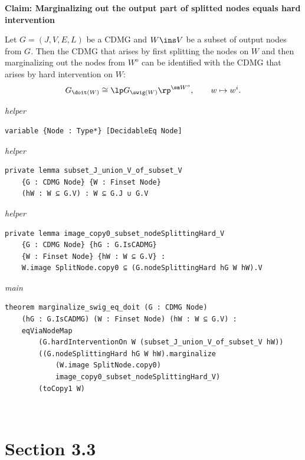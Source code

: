 \noindent\textbf{Claim: Marginalizing out the output part of splitted nodes equals hard intervention}\par\smallskip
{\appendixTexSize
     Let $G=(J,V,E,L)$ be a CDMG and $W \ins V$ be a subset of output nodes from $G$.
     Then the CDMG that arises by first splitting the nodes on $W$
      and then marginalizing out the nodes from $W^o$
     can be identified with the CDMG that arises by hard intervention on $W$:
     \[ G_{\doit(W)} \cong \lp G_{\swig(W)}\rp^{\sm W^o}, \qquad w \mapsto w^i. \]
\par}
\smallskip
{\small\textit{helper}}
\begin{verbatim}
variable {Node : Type*} [DecidableEq Node]
\end{verbatim}
{\small\textit{helper}}
\begin{verbatim}
private lemma subset_J_union_V_of_subset_V
    {G : CDMG Node} {W : Finset Node}
    (hW : W ⊆ G.V) : W ⊆ G.J ∪ G.V
\end{verbatim}
{\small\textit{helper}}
\begin{verbatim}
private lemma image_copy0_subset_nodeSplittingHard_V
    {G : CDMG Node} {hG : G.IsCADMG}
    {W : Finset Node} {hW : W ⊆ G.V} :
    W.image SplitNode.copy0 ⊆ (G.nodeSplittingHard hG W hW).V
\end{verbatim}
{\small\textit{main}}
\begin{verbatim}
theorem marginalize_swig_eq_doit (G : CDMG Node)
    (hG : G.IsCADMG) (W : Finset Node) (hW : W ⊆ G.V) :
    eqViaNodeMap
        (G.hardInterventionOn W (subset_J_union_V_of_subset_V hW))
        ((G.nodeSplittingHard hG W hW).marginalize
            (W.image SplitNode.copy0)
            image_copy0_subset_nodeSplittingHard_V)
        (toCopy1 W)
\end{verbatim}
~%

\vspace{\appendixNotesGap}

\section*{Section 3.3}

